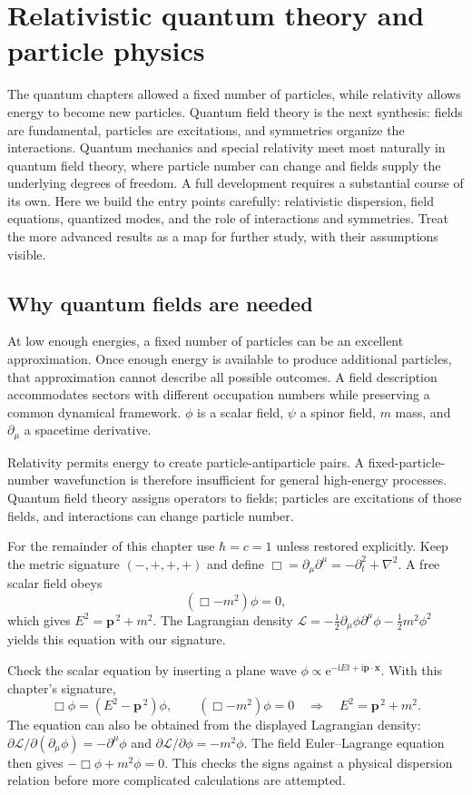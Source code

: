 \documentclass[11pt,oneside]{book}
\newcommand{\ii}{\mathrm{i}}
\newcommand{\ee}{\mathrm{e}}
\newcommand{\vect}[1]{\boldsymbol{#1}}
\newcommand{\lap}{\nabla^2}
\theoremstyle{reviewstyle}
\begin{document}
\chapter{Relativistic quantum theory and particle physics}
The quantum chapters allowed a fixed number of particles, while relativity allows energy to become new particles. Quantum field theory is the next synthesis: fields are fundamental, particles are excitations, and symmetries organize the interactions.
Quantum mechanics and special relativity meet most naturally in quantum field theory, where particle number can change and fields supply the underlying degrees of freedom. A full development requires a substantial course of its own. Here we build the entry points carefully: relativistic dispersion, field equations, quantized modes, and the role of interactions and symmetries. Treat the more advanced results as a map for further study, with their assumptions visible.

\section{Why quantum fields are needed}
At low enough energies, a fixed number of particles can be an excellent approximation. Once enough energy is available to produce additional particles, that approximation cannot describe all possible outcomes. A field description accommodates sectors with different occupation numbers while preserving a common dynamical framework. $\phi$ is a scalar field, $\psi$ a spinor field, $m$ mass, and $\partial_\mu$ a spacetime derivative.

Relativity permits energy to create particle-antiparticle pairs. A fixed-particle-number wavefunction is therefore insufficient for general high-energy processes. Quantum field theory assigns operators to fields; particles are excitations of those fields, and interactions can change particle number.

For the remainder of this chapter use $\hbar=c=1$ unless restored explicitly. Keep the metric signature $(-,+,+,+)$ and define $\Box=\partial_\mu\partial^\mu=-\partial_t^2+\lap$. A free scalar field obeys
\begin{equation}(\Box-m^2)\phi=0,\end{equation}
which gives $E^2=\vect p^{\,2}+m^2$. The Lagrangian density
$\mathcal L=-\tfrac12\partial_\mu\phi\partial^\mu\phi-\tfrac12m^2\phi^2$ yields this equation with our signature.

Check the scalar equation by inserting a plane wave $\phi\propto\ee^{-\ii Et+\ii\vect p\cdot\vect x}$. With this chapter's signature,
\begin{equation}
\Box\phi=(E^2-\vect p^{\,2})\phi,
\qquad (\Box-m^2)\phi=0
\quad\Longrightarrow\quad E^2=\vect p^{\,2}+m^2.
\end{equation}
The equation can also be obtained from the displayed Lagrangian density: $\partial\mathcal L/\partial(\partial_\mu\phi)=-\partial^\mu\phi$ and $\partial\mathcal L/\partial\phi=-m^2\phi$. The field Euler--Lagrange equation then gives $-\Box\phi+m^2\phi=0$. This checks the signs against a physical dispersion relation before more complicated calculations are attempted.
\end{document}
